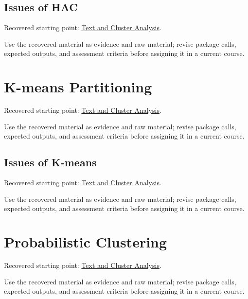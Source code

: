 \documentclass[
  letterpaper,
]{scrbook}
\begin{document}
\subsection*{Issues of HAC}\label{sec-pr-10-issues-of-hac}

Recovered starting point: \hyperref[sec-lab-clustering]{Text and Cluster
Analysis}.

Use the recovered material as evidence and raw material; revise package
calls, expected outputs, and assessment criteria before assigning it in
a current course.

\section*{K-means Partitioning}\label{sec-pr-10-k-means-partitioning}


Recovered starting point: \hyperref[sec-lab-clustering]{Text and Cluster
Analysis}.

Use the recovered material as evidence and raw material; revise package
calls, expected outputs, and assessment criteria before assigning it in
a current course.

\subsection*{Issues of K-means}\label{sec-pr-10-issues-of-k-means}

Recovered starting point: \hyperref[sec-lab-clustering]{Text and Cluster
Analysis}.

Use the recovered material as evidence and raw material; revise package
calls, expected outputs, and assessment criteria before assigning it in
a current course.

\section*{Probabilistic
Clustering}\label{sec-pr-10-probabilistic-clustering}


Recovered starting point: \hyperref[sec-lab-clustering]{Text and Cluster
Analysis}.

Use the recovered material as evidence and raw material; revise package
calls, expected outputs, and assessment criteria before assigning it in
a current course.
\end{document}
